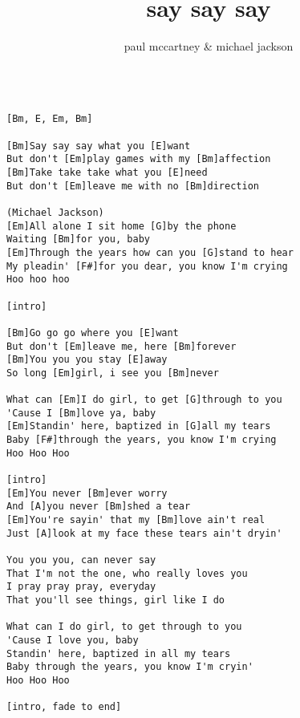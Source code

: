 \author{paul mccartney \& michael jackson}
\title{say say say}
\maketitle
\begin{verbatim}

[Bm, E, Em, Bm]

[Bm]Say say say what you [E]want
But don't [Em]play games with my [Bm]affection
[Bm]Take take take what you [E]need
But don't [Em]leave me with no [Bm]direction

(Michael Jackson)
[Em]All alone I sit home [G]by the phone
Waiting [Bm]for you, baby
[Em]Through the years how can you [G]stand to hear
My pleadin' [F#]for you dear, you know I'm crying
Hoo hoo hoo

[intro]

[Bm]Go go go where you [E]want
But don't [Em]leave me, here [Bm]forever
[Bm]You you you stay [E]away 
So long [Em]girl, i see you [Bm]never

What can [Em]I do girl, to get [G]through to you
'Cause I [Bm]love ya, baby
[Em]Standin' here, baptized in [G]all my tears
Baby [F#]through the years, you know I'm crying
Hoo Hoo Hoo

[intro]
[Em]You never [Bm]ever worry
And [A]you never [Bm]shed a tear
[Em]You're sayin' that my [Bm]love ain't real
Just [A]look at my face these tears ain't dryin'

You you you, can never say 
That I'm not the one, who really loves you
I pray pray pray, everyday
That you'll see things, girl like I do

What can I do girl, to get through to you
'Cause I love you, baby
Standin' here, baptized in all my tears
Baby through the years, you know I'm cryin'
Hoo Hoo Hoo

[intro, fade to end]
\end{verbatim}